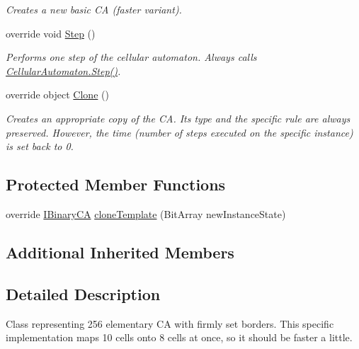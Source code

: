 \begin{DoxyCompactItemize}
\begin{DoxyCompactList}\small\item\em Creates a new basic C\+A (faster variant). \end{DoxyCompactList}\item 
override void \hyperlink{class_cellular_1_1_elementary_fast_automaton_aa877bef8b8242c58e190a884d18f3b5f}{Step} ()
\begin{DoxyCompactList}\small\item\em Performs one step of the cellular automaton. Always calls {\ttfamily \hyperlink{class_cellular_1_1_cellular_automaton_aa70848d58015575974bc875ac5a89ae7}{Cellular\+Automaton.\+Step()}}. \end{DoxyCompactList}\item 
override object \hyperlink{class_cellular_1_1_elementary_fast_automaton_a98bbdcade0ac93dd0fbc96ba253c2978}{Clone} ()
\begin{DoxyCompactList}\small\item\em Creates an appropriate copy of the C\+A. Its type and the specific rule are always preserved. However, the time (number of steps executed on the specific instance) is set back to 0. \end{DoxyCompactList}\end{DoxyCompactItemize}
\subsection*{Protected Member Functions}
\begin{DoxyCompactItemize}
\item 
override \hyperlink{interface_cellular_1_1_i_binary_c_a}{I\+Binary\+C\+A} \hyperlink{class_cellular_1_1_elementary_fast_automaton_a95b5abc22d134cb9640b56a0a70c1454}{clone\+Template} (Bit\+Array new\+Instance\+State)
\end{DoxyCompactItemize}
\subsection*{Additional Inherited Members}


\subsection{Detailed Description}
Class representing 256 elementary C\+A with firmly set borders. This specific implementation maps 10 cells onto 8 cells at once, so it should be faster a little. 



